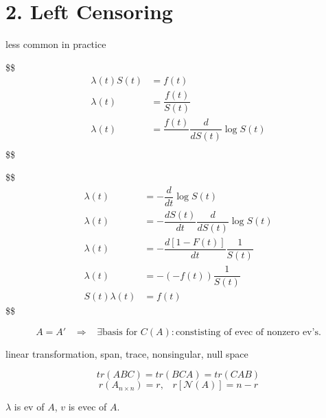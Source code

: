 \documentclass[
]{book}
\theoremstyle{definition}
\theoremstyle{definition}
\theoremstyle{definition}
\theoremstyle{definition}
\theoremstyle{remark}
\begin{document}
\hypertarget{left-censoring}{%
\chapter{2. Left Censoring}\label{left-censoring}}

less common in practice

\$\$
\begin{align}

\lambda(t) S(t)&= f(t) \\

\lambda(t) &= \dfrac{f(t)}{S(t)} \\

\lambda(t) &= \dfrac{f(t)}{} \dfrac{d}{dS(t)}\log S(t) \\


\end{align}
\$\$

\$\$
\begin{align}

\lambda(t) &= - \dfrac{d}{dt} \log S(t) \\

\lambda(t) &= - \dfrac {dS(t)}{dt} \dfrac{d}{dS(t)} \log S(t) \\

\lambda(t) &= - \dfrac {d[1-F(t)]}{dt} \dfrac{1}{S(t)} \\

\lambda(t) &= - (-f(t)) \dfrac{1}{S(t)} \\

S(t)\lambda(t) &= f(t)

\end{align}
\$\$

\[
A = A'\; \; \; \Longrightarrow \; \; \; \exists \text{basis for } C(A):\text{constisting of evec of nonzero ev's.}
\]

linear transformation, span, trace, nonsingular, null space

\[
tr(ABC) = tr(BCA)=tr(CAB)
\]
\[
r(A_{n \times n})=r, \; \; \; r[\mathcal{N}(A)] = n-r
\]

\(\lambda\) is ev of \(A\), \(v\) is evec of \(A\).
\end{document}
